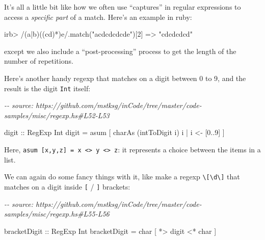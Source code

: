 \documentclass[]{article}
\newenvironment{Shaded}{}{}
\newcommand{\CharTok}[1]{\textcolor[rgb]{0.25,0.44,0.63}{#1}}
\newcommand{\CommentTok}[1]{\textcolor[rgb]{0.38,0.63,0.69}{\textit{#1}}}
\newcommand{\DataTypeTok}[1]{\textcolor[rgb]{0.56,0.13,0.00}{#1}}
\newcommand{\DecValTok}[1]{\textcolor[rgb]{0.25,0.63,0.44}{#1}}
\newcommand{\FunctionTok}[1]{\textcolor[rgb]{0.02,0.16,0.49}{#1}}
\newcommand{\NormalTok}[1]{#1}
\newcommand{\OperatorTok}[1]{\textcolor[rgb]{0.40,0.40,0.40}{#1}}
\newcommand{\OtherTok}[1]{\textcolor[rgb]{0.00,0.44,0.13}{#1}}
\newcommand{\StringTok}[1]{\textcolor[rgb]{0.25,0.44,0.63}{#1}}
\begin{document}
It's all a little bit like how we often use ``captures'' in regular expressions
to access a \emph{specific part} of a match. Here's an example in ruby:

\begin{Shaded}
\begin{Highlighting}[]
\NormalTok{irb> }\OtherTok{/(a|b)((cd)*)e/}\NormalTok{.match(}\StringTok{"acdcdcdcde"}\NormalTok{)[}\DecValTok{2}\NormalTok{]}
\NormalTok{=> }\StringTok{"cdcdcdcd"}
\end{Highlighting}
\end{Shaded}

except we also include a ``post-processing'' process to get the length of the
number of repetitions.

Here's another handy regexp that matches on a digit between 0 to 9, and the
result is the digit \texttt{Int} itself:

\begin{Shaded}
\begin{Highlighting}[]
\CommentTok{{-}{-} source: https://github.com/mstksg/inCode/tree/master/code{-}samples/misc/regexp.hs\#L52{-}L53}

\OtherTok{digit ::} \DataTypeTok{RegExp} \DataTypeTok{Int}
\NormalTok{digit }\OtherTok{=}\NormalTok{ asum [ charAs (}\FunctionTok{intToDigit}\NormalTok{ i) i }\OperatorTok{|}\NormalTok{ i }\OtherTok{<{-}}\NormalTok{ [}\DecValTok{0}\OperatorTok{..}\DecValTok{9}\NormalTok{] ]}
\end{Highlighting}
\end{Shaded}

Here,
\texttt{asum\ {[}x,y,z{]}\ =\ x\ \textless{}\textbar{}\textgreater{}\ y\ \textless{}\textbar{}\textgreater{}\ z}:
it represents a choice between the items in a list.

We can again do some fancy things with it, like make a regexp
\texttt{\textbackslash{}{[}\textbackslash{}d\textbackslash{}{]}} that matches on
a digit inside \texttt{{[}} / \texttt{{]}} brackets:

\begin{Shaded}
\begin{Highlighting}[]
\CommentTok{{-}{-} source: https://github.com/mstksg/inCode/tree/master/code{-}samples/misc/regexp.hs\#L55{-}L56}

\OtherTok{bracketDigit ::} \DataTypeTok{RegExp} \DataTypeTok{Int}
\NormalTok{bracketDigit }\OtherTok{=}\NormalTok{ char }\CharTok{\textquotesingle{}[\textquotesingle{}} \OperatorTok{*>}\NormalTok{ digit }\OperatorTok{<*}\NormalTok{ char }\CharTok{\textquotesingle{}]\textquotesingle{}}
\end{Highlighting}
\end{Shaded}
\end{document}
